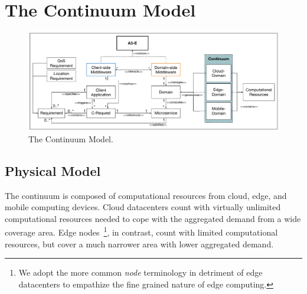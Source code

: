 \section{The Continuum Model}\label{sec:proposal}

\begin{figure}[tbp]
	\includegraphics[width=1\textwidth]{figs/A3-E-model.pdf}
	\caption{The Continuum Model.}
	\label{fig:Continuum-model}
\end{figure}


\subsection{Physical Model}


The continuum is composed of computational resources from cloud, edge, and mobile computing devices. Cloud datacenters count with virtually unlimited computational resources needed to cope with the aggregated demand from a wide coverage area. Edge nodes~\footnote{We adopt the more common \textit{node} terminology in detriment of edge datacenters to empathize the fine grained nature of edge computing.}, in contrast, count with limited computational resources, but cover a much narrower area with lower aggregated demand. 

